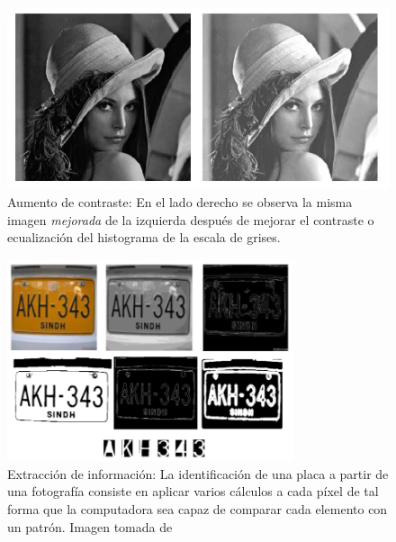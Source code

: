\documentclass{article}
\begin{document}
\begin{figure}[ht]
\centering
\includegraphics[width=.75\textwidth]{lena-contraste.jpg}
\caption{Aumento de contraste: En el lado derecho se observa la misma imagen \textit{mejorada} de la izquierda después de mejorar el contraste o ecualización del histograma de la escala de grises.}
\label{fig:lena-contraste}
\end{figure}

\begin{figure}[ht]
\centering
\includegraphics[width=0.75\textwidth]{placas-viz.png}
\caption{Extracción de información: La identificación de una placa a partir de una fotografía consiste en aplicar varios cálculos a cada píxel de tal forma que la computadora sea capaz de comparar cada elemento con un patrón. Imagen tomada de \cite{placas} }
\label{fig:placas}
\end{figure}
\end{document}
